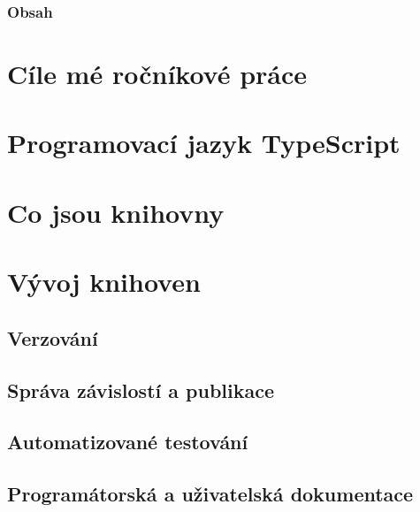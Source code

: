 




\begin{frame}
    \frametitle{Obsah}
    \tableofcontents
\end{frame}

\section[Ročníková práce]{Cíle mé ročníkové práce}	

	

\section[TypeScript]{Programovací jazyk TypeScript}





\section[Knihovny]{Co jsou knihovny}



\section[Vývoj knihoven]{Vývoj knihoven}

	

\subsection{Verzování}



\subsection[Správce balíčků]{Správa závislostí a publikace}



\subsection[Testování]{Automatizované testování}

	

\subsection[Dokumentace]{Programátorská a uživatelská dokumentace}

	


